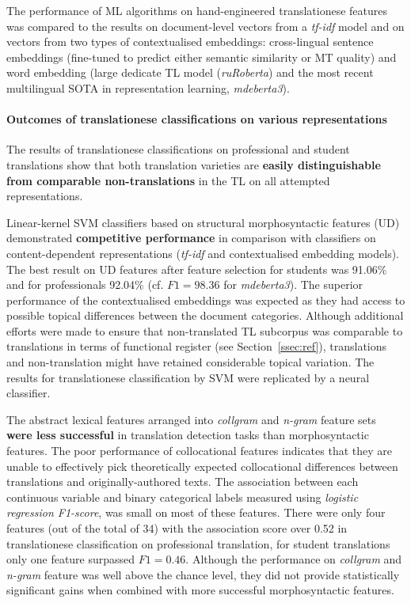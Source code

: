 The performance of ML algorithms on hand-engineered translationese features was compared to the results on document-level vectors from a \textit{tf-idf} model and on vectors from two types of contextualised embeddings: cross-lingual sentence embeddings (fine-tuned to predict either semantic similarity or MT quality) and word embedding (large dedicate TL model (\textit{ruRoberta}) and the most recent multilingual SOTA in representation learning, \textit{mdeberta3}). 

\paragraph{Outcomes of translationese classifications on various representations} 
The results of translationese classifications on professional and student translations show that both translation varieties are \textbf{easily distinguishable from comparable non-translations} in the TL on all attempted representations. 

Linear-kernel SVM classifiers based on structural morphosyntactic features (UD) demonstrated \textbf{competitive performance} in comparison with classifiers on content-dependent representations (\textit{tf-idf} and contextualised embedding models). 
The best result on UD features after feature selection for students was 91.06\% and for professionals 92.04\% (cf. $F1=98.36$ for \textit{mdeberta3}).
The superior performance of the contextualised embeddings was expected as they had access to possible topical differences between the document categories. Although additional efforts were made to ensure that non-translated TL subcorpus was comparable to translations in terms of functional register (see Section~\ref{ssec:ref}), translations and non-translation might have retained considerable topical variation. The results for translationese classification by SVM were replicated by a neural classifier.

The abstract lexical features arranged into \textit{collgram} and \textit{n-gram} feature sets \textbf{were less successful} in translation detection tasks than morphosyntactic features. 
The poor performance of collocational features indicates that they are unable to effectively pick theoretically expected collocational differences between translations and originally-authored texts. The association between each continuous variable and binary categorical labels measured using \textit{logistic regression F1-score}, was small on most of these features. There were only four features (out of the total of 34) with the association score over 0.52 in translationese classification on professional translation, for student translations only one feature surpassed $F1=0.46$. Although the performance on \textit{collgram} and \textit{n-gram} feature was well above the chance level, they did not provide statistically significant gains when combined with more successful morphosyntactic features. 

